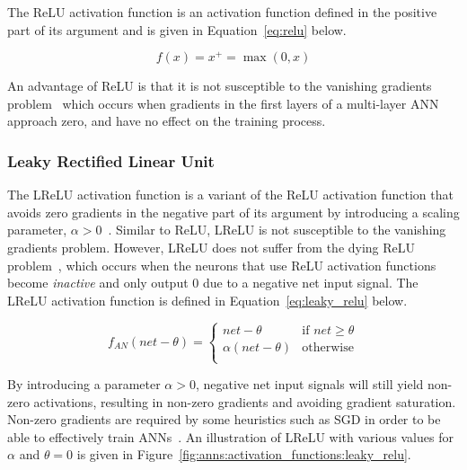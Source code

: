 The \acf{ReLU} activation function is an activation function defined in the positive part of its argument and is given in Equation~\eqref{eq:relu} below.

\begin{equation}
      f(x) = x^{+} = \max(0,x)
      \label{eq:relu}
\end{equation}

\noindent
An advantage of \acs{ReLU} is that it is not susceptible to the vanishing gradients problem~\cite{ref:xu:2015, ref:maksutov:2018} which occurs when gradients in the first layers of a multi-layer \acs{ANN} approach zero, and have no effect on the training process.


\subsubsection{Leaky Rectified Linear Unit}\label{sec:anns:an:act_functions:leaky_relu}

The \acf{LReLU} activation function is a variant of the \acs{ReLU} activation function that avoids zero gradients in the negative part of its argument by introducing a scaling parameter, $\alpha > 0$~\cite{ref:xu:2015}. Similar to \acs{ReLU}, \acs{LReLU} is not susceptible to the vanishing gradients problem. However, \acs{LReLU} does not suffer from the dying \acs{ReLU} problem~\cite{ref:agarap:2018}, which occurs when the neurons that use \acs{ReLU} activation functions become \textit{inactive} and only output $0$ due to a negative net input signal. The \acs{LReLU} activation function is defined in Equation~\eqref{eq:leaky_relu} below.

\begin{equation}
      f_{AN}(net - \theta) =
      \begin{cases}
            net - \theta         & \text{if $net \geq \theta $} \\
            \alpha(net - \theta) & \text{otherwise}             \\
      \end{cases}
      \label{eq:leaky_relu}
\end{equation}

\noindent
By introducing a parameter $\alpha > 0$, negative net input signals will still yield non-zero activations, resulting in non-zero gradients and avoiding gradient saturation. Non-zero gradients are required by some heuristics such as \acs{SGD} in order to be able to effectively train \acp{ANN}~\cite{ref:hanin:2018}. An illustration of \acs{LReLU} with various values for $\alpha$ and $\theta = 0$ is given in Figure~\ref{fig:anns:activation_functions:leaky_relu}.

